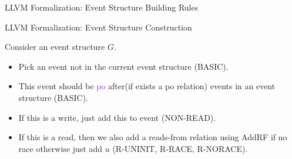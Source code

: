 \documentclass[xcolor=dvipsnames, notes]{beamer}
\newcommand{\po}{\textcolor{BlueViolet}{po}}
\begin{document}
    \begin{frame}{LLVM Formalization: Event Structure Building Rules}
        
        \begin{figure}
        \end{figure}

        \begin{figure}
        \end{figure}

    \end{frame}

    \begin{frame}{LLVM Formalization: Event Structure Construction}
        
        Consider an event structure $G$.
        \begin{itemize}
            \item Pick an event not in the current event structure (BASIC).
            \item This event should be {\po} after(if exists a po relation) events in an event structure (BASIC).
            \item If this is a write, just add this to event (NON-READ).
            \item If this is a read, then we also add a reads-from relation using AddRF if no race otherwise just add $u$ (R-UNINIT, R-RACE, R-NORACE).
        \end{itemize}
        
    \end{frame}
\end{document}
